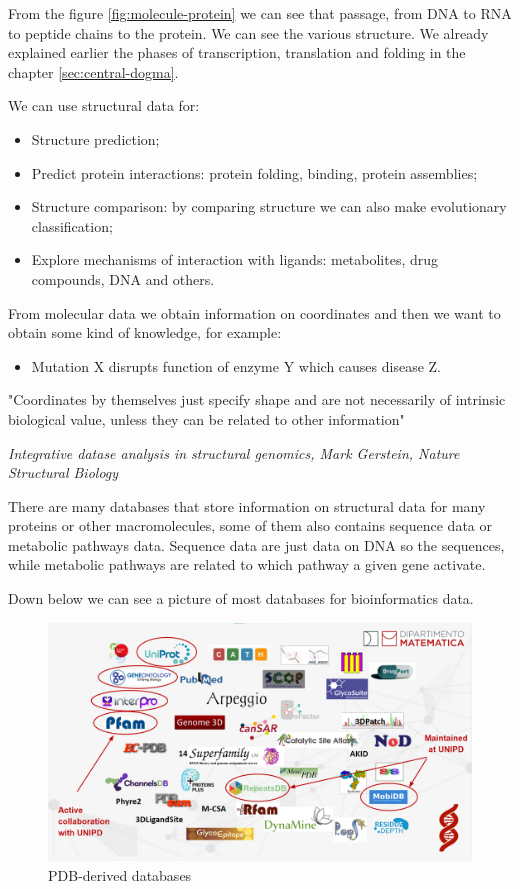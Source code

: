 From the figure \ref{fig:molecule-protein} we can see that passage, from DNA to RNA to peptide chains to the protein. We can see the various structure. We already explained earlier the phases of transcription, translation and folding in the chapter \ref{sec:central-dogma}. 

We can use structural data for:
\begin{itemize}
    \item Structure prediction;
    \item Predict protein interactions: protein folding, binding, protein assemblies;
    \item Structure comparison: by comparing structure we can also make evolutionary classification;
    \item Explore mechanisms of interaction with ligands: metabolites, drug compounds, DNA and others.
\end{itemize}

From molecular data we obtain information on coordinates and then we want to obtain some kind of knowledge, for example:
\begin{itemize}
    \item Mutation X disrupts function of enzyme Y which causes disease Z.
\end{itemize}

\vspace{1em}

\noindent "Coordinates by themselves just specify shape and are not necessarily of intrinsic biological value, unless they can be related to other information"

\noindent \small{\textit{Integrative datase analysis in structural genomics, Mark Gerstein, Nature Structural Biology}}

There are many databases that store information on structural data for many proteins or other macromolecules, some of them also contains sequence data or metabolic pathways data. Sequence data are just data on DNA so the sequences, while metabolic pathways are related to which pathway a given gene activate.

Down below we can see a picture of most databases for bioinformatics data.
\begin{figure}[h!]
    \centering
    \includegraphics[scale=0.3]{res/proteins_overview/pdb.png}
    \caption{PDB-derived databases}
\end{figure}

